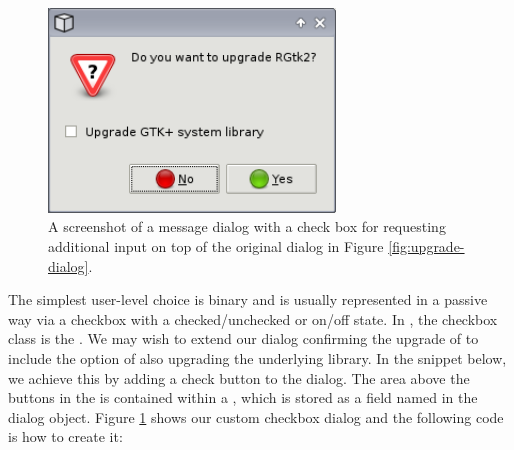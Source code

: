 \documentclass[article,shortnames]{jss}
\begin{document}
\begin{figure}[tbp]
  \begin{center}
    \includegraphics[width=3in]{checkbox-dialog.png}
    \caption{\label{fig:checkbox-dialog}A screenshot of a message
dialog
      with a 
      check box for requesting additional input on top of the
      original dialog in Figure \ref{fig:upgrade-dialog}.}
  \end{center}
\end{figure}

The simplest user-level choice is binary and is usually represented in
a passive way via a checkbox with a checked/unchecked or  on/off 
state. In , the checkbox class is the
. We may wish to extend our dialog confirming the
upgrade of  to include the option of also upgrading the
underlying   library. In the snippet below, we
achieve this by adding a
check button to the dialog.  The area above the buttons in the
 is contained within a , which is stored
as a field named  in the dialog object. Figure
\ref{fig:checkbox-dialog} shows
our custom checkbox dialog and the following code is how to create it:
\end{document}
